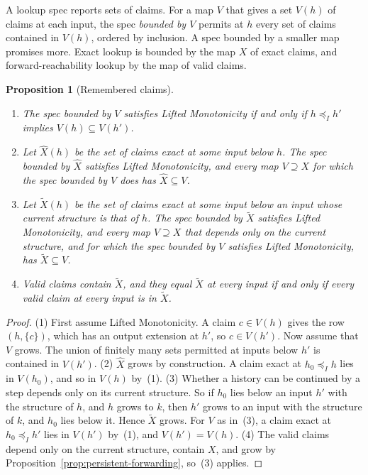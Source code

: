 \documentclass[sigconf]{cidr-2027}
\newtheorem{proposition}{Proposition}
\theoremstyle{remark}
\newcommand{\InputOrd}{\preceq_I}
\newcommand{\outnoun}{output extension\xspace}%
\begin{document}
A lookup spec reports sets of claims. For a map $V$ that gives a set $V(h)$
of claims at each input, the spec \emph{bounded by $V$} permits at $h$ every
set of claims contained in $V(h)$, ordered by inclusion. A spec bounded by a
smaller map promises more. Exact lookup is bounded by the map $X$ of exact
claims, and forward-reachability lookup by the map of valid claims.

\begin{proposition}[Remembered claims]
\label{prop:remembered-claims}
\leavevmode
\begin{enumerate}
\item
The spec bounded by $V$ satisfies Lifted Monotonicity if and only if
        $h\InputOrd h'$ implies $V(h)\subseteq V(h')$.
\item
Let $\widehat X(h)$ be the set of claims exact at some input below
        $h$. The spec bounded by $\widehat X$ satisfies Lifted Monotonicity,
        and every map $V\supseteq X$ for which the spec bounded by $V$ does
        has $\widehat X\subseteq V$.
\item
Let $\widetilde X(h)$ be the set of claims exact at some input below an
        input whose current structure is that of $h$. The spec bounded by
        $\widetilde X$ satisfies Lifted Monotonicity, and every map
        $V\supseteq X$ that depends only on the current structure, and for
        which the spec bounded by $V$ satisfies Lifted Monotonicity, has
        $\widetilde X\subseteq V$.
\item
Valid claims contain $\widetilde X$, and they equal $\widetilde X$ at
        every input if and only if every valid claim at every input is in
        $\widetilde X$.
\end{enumerate}
\end{proposition}

\begin{proof}
\textcolor{reviewed}{(1) First assume Lifted Monotonicity.} A claim $c\in V(h)$ gives the row
$(h,\{c\})$, which has an \outnoun at $h'$, so $c\in V(h')$. Now assume that
$V$ grows. The union of finitely many sets permitted at inputs below $h'$ is
contained in $V(h')$. (2) $\widehat X$ grows by construction. A claim exact
at $h_0\InputOrd h$ lies in $V(h_0)$, and so in $V(h)$ by~(1). (3) Whether a
history can be continued by a step depends only on its current structure. So
if $h_0$ lies below an input $h'$ with the structure of $h$, and $h$ grows to
$k$, then $h'$ grows to an input with the structure of $k$, and $h_0$ lies
below it. Hence $\widetilde X$ grows. For $V$ as in~(3), a claim exact at
$h_0\InputOrd h'$ lies in $V(h')$ by~(1), and $V(h')=V(h)$. (4) The valid
claims depend only on the current structure, contain $X$, and grow by
Proposition~\ref{prop:persistent-forwarding}, so~(3) applies.
\end{proof}
\end{document}
